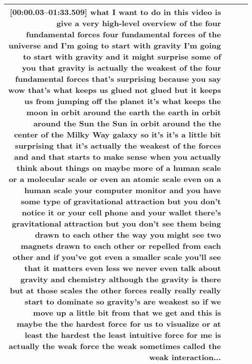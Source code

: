 \documentclass[10pt]{article}
\begin{document}
\begin{tiny}
\begin{longtable}{|r|p{0.375in}|p{1.275in}|p{3.5in}|}
                                                                                                                                                                                                                               \textbf{[00:00.03--01:33.509]} what I want to do in this video is give a very high-level overview of the four fundamental forces four fundamental forces of the universe and I'm going to start with gravity I'm going to start with gravity and it might surprise some of you that gravity is actually the weakest of the four fundamental forces that's surprising because you say wow that's what keeps us glued not glued but it keeps us from jumping off the planet it's what keeps the moon in orbit around the earth the earth in orbit around the Sun the Sun in orbit around the the center of the Milky Way galaxy so it's it's a little bit surprising that it's actually the weakest of the forces and and that starts to make sense when you actually think about things on maybe more of a human scale or a molecular scale or even an atomic scale even on a human scale your computer monitor and you have some type of gravitational attraction but you don't notice it or your cell phone and your wallet there's gravitational attraction but you don't see them being drawn to each other the way you might see two magnets drawn to each other or repelled from each other and if you've got even a smaller scale you'll see that it matters even less we never even talk about gravity and chemistry although the gravity is there but at those scales the other forces really really really start to dominate so gravity's are weakest so if we move up a little bit from that we get and this is maybe the the hardest force for us to visualize or at least the hardest the least intuitive force for me is actually the weak force the weak sometimes called the weak interaction... \\\hline

\end{longtable}
\end{tiny}
\end{document}

